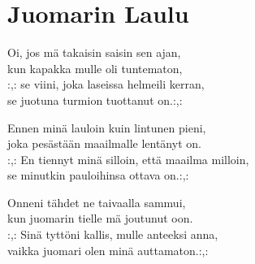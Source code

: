 \section{Juomarin Laulu}
Oi, jos mä takaisin saisin sen ajan,\\
kun kapakka mulle oli tuntematon,\\
:,: se viini, joka laseissa helmeili kerran,\\
se juotuna turmion tuottanut on.:,:

Ennen minä lauloin kuin lintunen pieni,\\
joka pesästään maailmalle lentänyt on.\\
:,: En tiennyt minä silloin, että maailma milloin,\\
se minutkin pauloihinsa ottava on.:,:

Onneni tähdet ne taivaalla sammui,\\
kun juomarin tielle mä joutunut oon.\\
:,: Sinä tyttöni kallis, mulle anteeksi anna,\\
vaikka juomari olen minä auttamaton.:,:
